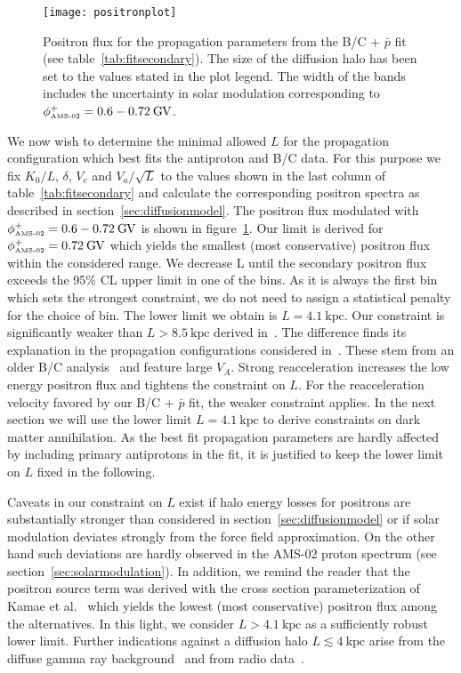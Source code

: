 \documentclass[a4paper,11pt]{article}
\newcommand{\eVdist}{\kern-0.06em}
\newcommand{\gv}{\:\text{G\eVdist V}}
\newcommand{\kpc}{\:\text{kpc}}
\begin{document}
\begin{figure}[htp]
\begin{center}
  \texttt{[image: positronplot]}
\end{center}
\caption{Positron flux for the propagation parameters from the B/C + $\bar{p}$ fit (see table~\ref{tab:fitsecondary}). The size of the diffusion halo has been set to the values stated in the plot legend. The width of the bands includes the uncertainty in solar modulation corresponding to $\phi^+_{\text{\tiny{AMS-02}}}=0.6-0.72\gv$.}
\label{fig:positron}
\end{figure}

We now wish to determine the minimal allowed $L$ for the propagation configuration which best fits the antiproton and B/C data. For this purpose we fix $K_0/L$, $\delta$, $V_c$ and $V_a/\sqrt{L}$ to the values shown in the last column of table~\ref{tab:fitsecondary} and calculate the corresponding positron spectra as described in section~\ref{sec:diffusionmodel}. The positron flux modulated with $\phi^+_{\text{\tiny{AMS-02}}}=0.6-0.72\gv$ is shown in figure~\ref{fig:positron}. Our limit is derived for $\phi^+_{\text{\tiny{AMS-02}}}=0.72\gv$ which yields the smallest (most conservative) positron flux within the considered range. We decrease L until the secondary positron flux exceeds the 95\% CL upper limit in one of the bins. As it is always the first bin which sets the strongest constraint, we do not need to assign a statistical penalty for the choice of bin. The lower limit we obtain is $L=4.1\kpc$. Our constraint is significantly weaker than $L>8.5\kpc$ derived in~\cite{Boudaud:2016jvj}. The difference finds its explanation in the propagation configurations considered in~\cite{Boudaud:2016jvj}. These stem from an older B/C analysis~\cite{Maurin:2001sj} and feature large $V_A$. Strong reacceleration increases the low energy positron flux and tightens the constraint on $L$. For the reacceleration velocity favored by our B/C + $\bar{p}$ fit, the weaker constraint applies. In the next section we will use the lower limit $L=4.1\kpc$ to derive constraints on dark matter annihilation. As the best fit propagation parameters are hardly affected by including primary antiprotons in the fit, it is justified to keep the lower limit on $L$ fixed in the following.

Caveats in our constraint on $L$ exist if halo energy losses for positrons are substantially stronger than considered in section~\ref{sec:diffusionmodel} or if solar modulation deviates strongly from the force field approximation. On the other hand such deviations are hardly observed in the AMS-02 proton spectrum (see section~\ref{sec:solarmodulation}). In addition, we remind the reader that the positron source term was derived with the cross section parameterization of Kamae et al.~\cite{Kamae:2006bf} which yields the lowest (most conservative) positron flux among the alternatives. In this light, we consider $L>4.1\kpc$ as a sufficiently robust lower limit. Further indications against a diffusion halo $L\lesssim 4\kpc$ arise from the diffuse gamma ray background~\cite{Ackermann:2012pya} and from radio data~\cite{Bringmann:2011py,DiBernardo:2012zu,Orlando:2013ysa}. 
\end{document}
